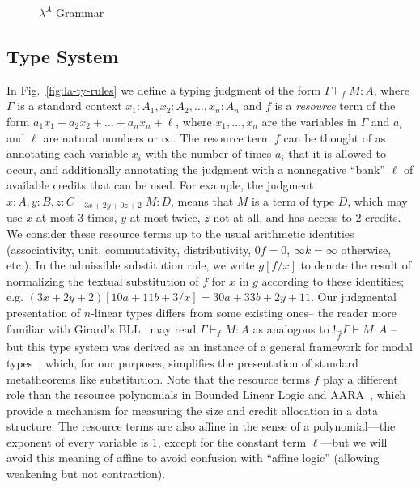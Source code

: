 \begin{figure}
  \vspace{-0.2in}
  \caption{$\lambda^A$ Grammar}
  \label{fig:la-bnf}
\end{figure}

\subsection{Type System}

In Fig.~\ref{fig:la-ty-rules} we define
a typing judgment of the form
$\Gamma \vdash_f M : A$, where $\Gamma$ is a standard context $x_1:A_1,
x_2:A_2, \ldots, x_n : A_n$ and $f$ is a \textit{resource} term of the
form $a_1 x_1 + a_2 x_2 + \ldots + a_n x_n + \ell$, where
$x_1,\ldots,x_n$ are the variables in $\Gamma$ and $a_i$ and $\ell$ are
natural numbers or $\infty$.  The resource term $f$ can be
thought of as annotating each variable $x_i$ with the number of times
$a_i$ that it is allowed to occur, and additionally annotating the
judgment with a nonnegative ``bank'' $\ell$ of available credits
that can be used.  For example, the judgment $x : A, y : B, z : C
\vdash_{3x+2y+0z+2} M : D$, means that $M$ is a term of type $D$, which
may use $x$ at most $3$ times, $y$ at most twice, $z$ not at all, and
has access to $2$ credits.  We consider these resource terms up to the
usual arithmetic identities (associativity, unit, commutativity,
distributivity, $0 f = 0$, $\infty k = \infty$ otherwise, etc.).  In the
admissible substitution rule, we write $g[f/x]$ to denote the result of
normalizing the textual substitution of $f$ for $x$ in $g$ according to
these identities; e.g. $(3x+2y+2)[10a+11b+3/x] = 30a+33b+2y+11$. 
Our judgmental presentation of $n$-linear types differs from some 
existing ones-- the reader more familiar with Girard's BLL~\cite{girard-et-al:tcs92:bll}
may read $\Gamma \vdash_f M : A$ as analogous to $!_{\vec{f}} \Gamma \vdash M : A$
-- but this type system was derived as an instance of a general framework for modal
types~\cite{lsr}, which, for our purposes, simplifies the presentation of standard 
metatheorems like substitution. Note that
the resource terms $f$ play a different role than the resource
polynomials in Bounded Linear Logic and AARA~\cite{girard-et-al:tcs92:bll,hoffmann-et-al:toplas12:multivariate-amortized}, 
which provide a mechanism for measuring the size and credit allocation in a
data structure.  The resource terms are also affine in the sense of a
polynomial---the exponent of every variable is 1, except for the constant term
$\ell$---but we will avoid this meaning of affine to avoid
confusion with ``affine logic'' (allowing weakening but not contraction).

